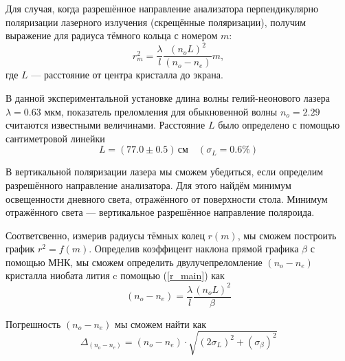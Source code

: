 \documentclass[12pt]{article}
\begin{document}
\par
	Для случая, когда разрешённое направление анализатора перпендикулярно поляризации лазерного излучения (скрещённые поляризации), получим выражение для радиуса тёмного кольца с номером $m$:
\begin{equation}
	r_m^2 = \frac{\lambda}{l} \frac{\left(n_o L \right)^2}{\left(n_o - n_e \right)} m, \label{r_main}
\end{equation}
где $L$ --- расстояние от центра кристалла до экрана.
\par
	В данной экспериментальной установке длина волны гелий-неонового лазера $\lambda = 0.63$ мкм, показатель преломления для обыкновенной волны $n_o = 2.29$ считаются известными величинами. Расстояние $L$ было определено с помощью сантиметровой линейки
\[
	L = \left(77.0 \pm 0.5 \right) \, \text{см} \quad \left(\sigma_L = 0.6 \% \right)
\]
\par
	В вертикальной поляризации лазера мы сможем убедиться, если определим разрешённого направление анализатора. Для этого найдём минимум освещенности дневного света, отражённого от поверхности стола. Минимум отражённого света --- вертикальное разрешённое направление поляроида. 
\par
	Соответсвенно, измерив радиусы тёмных колец $r(m)$, мы сможем построить график $r^2 = f(m)$. Определив коэффицент наклона прямой графика $\beta$ с помощью МНК, мы сможем определить двулучепреломление $\left( n_o - n_e \right)$ кристалла ниобата лития c помощью (\ref{r_main}) как
\[
	\left( n_o - n_e \right) = \frac{\lambda}{l} \frac{\left( n_o L \right)^2}{\beta}
\]
\par
	Погрешность $\left( n_o - n_e \right)$ мы сможем найти как
\[
	\Delta_\text{$\left( n_o - n_e \right)$} =  \left( n_o - n_e \right) \cdot \sqrt{( 2\sigma_L)^2 + (\sigma_\beta)^2}
\]
\newpage
\end{document}
